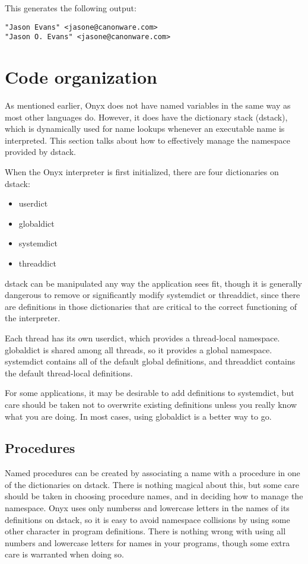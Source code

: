 This generates the following output:

\begin{verbatim}
"Jason Evans" <jasone@canonware.com>
"Jason O. Evans" <jasone@canonware.com>
\end{verbatim}

\section{Code organization}

As mentioned earlier, Onyx does not have named variables in the same way as most
other languages do.  However, it does have the dictionary stack (dstack), which
is dynamically used for name lookups whenever an executable name is interpreted.
This section talks about how to effectively manage the namespace provided by
dstack.

When the Onyx interpreter is first initialized, there are four dictionaries on
dstack:

\begin{itemize}
\item{userdict}
\item{globaldict}
\item{systemdict}
\item{threaddict}
\end{itemize}

dstack can be manipulated any way the application sees fit, though it is
generally dangerous to remove or significantly modify systemdict or threaddict,
since there are definitions in those dictionaries that are critical to the
correct functioning of the interpreter.

Each thread has its own userdict, which provides a thread-local namespace.
globaldict is shared among all threads, so it provides a global namespace.
systemdict contains all of the default global definitions, and threaddict
contains the default thread-local definitions.

For some applications, it may be desirable to add definitions to systemdict, but
care should be taken not to overwrite existing definitions unless you really
know what you are doing.  In most cases, using globaldict is a better way to
go.

\subsection{Procedures}

Named procedures can be created by associating a name with a procedure in one of
the dictionaries on dstack.  There is nothing magical about this, but some care
should be taken in choosing procedure names, and in deciding how to manage the
namespace.  Onyx uses only numberss and lowercase letters in the names of its
definitions on dstack, so it is easy to avoid namespace collisions by using some
other character in program definitions.  There is nothing wrong with using all
numbers and lowercase letters for names in your programs, though some extra care
is warranted when doing so.

